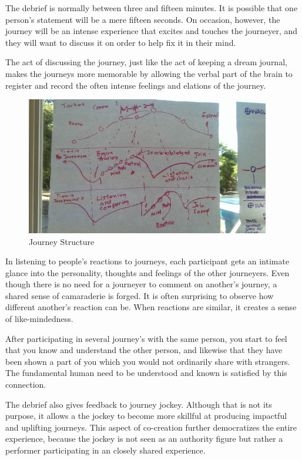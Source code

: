 \documentclass[12pt]{book}
\begin{document}
The debrief is normally between three and fifteen minutes. It
is possible that one person's statement will be a mere fifteen
seconds. On occasion, however, the journey will be an intense
experience that excites and touches the journeyer, and they
will want to discuss it on order to help fix it in their mind.

The act of discussing the journey, just like the act of keeping
a dream journal, makes the journeys more memorable by allowing
the verbal part of the brain to register and record the often
intense feelings and elations of the journey.

\begin{figure}
  \centering
     \includegraphics[width=0.95\textwidth]{WacuriFigures/JourneyerInteraction.jpg}
     \caption{Journey Structure}
  \label{fig:closeup}     
\end{figure}


In listening to people's reactions to journeys, each participant
gets an intimate glance into the personality, thoughts and feelings
of the other journeyers. Even though there is no need for a journeyer
to comment on another's journey, a shared sense of camaraderie is forged.
It is often surprising to observe how different another's reaction
can be. When reactions are similar, it creates a sense of like-mindedness.

After participating in several journey's with the same person, you
start to feel that you know and understand the other person, and
likewise that they have been shown a part of you which you would
not ordinarily share with strangers. The fundamental human need
to be understood and known is satisfied by this connection.

The debrief also gives feedback to journey jockey. Although that is
not its purpose, it allows a the jockey to become more skillful
at producing impactful and uplifting journeys. This aspect of
co-creation further democratizes the entire experience, because
the jockey is not seen as an authority figure but rather a
performer participating in an closely shared experience.
\end{document}
